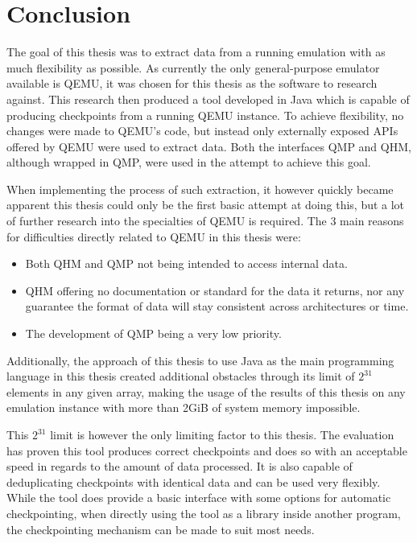 
\chapter{Conclusion}\label{chap:Conclusion}
The goal of this thesis was to extract data from a running emulation
with as much flexibility as possible.
As currently the only general-purpose emulator available is QEMU,
it was chosen for this thesis as the software to research against.
This research then produced a tool developed in Java
which is capable of producing checkpoints from a running QEMU instance.
To achieve flexibility, no changes were made to QEMU's code,
but instead only externally exposed APIs offered by QEMU were used to extract data.
Both the interfaces QMP and QHM, although wrapped in QMP,
were used in the attempt to achieve this goal.

When implementing the process of such extraction,
it however quickly became apparent this thesis could only be the first basic attempt at doing this,
but a lot of further research into the specialties of QEMU is required.
The 3 main reasons for difficulties directly related to QEMU in this thesis were:
\begin{itemize}
    \item Both QHM and QMP not being intended to access internal data.
    \item QHM offering no documentation or standard for the data it returns,
    nor any guarantee the format of data will stay consistent across architectures or time.
    \item The development of QMP being a very low priority.
\end{itemize}
Additionally, the approach of this thesis to use Java as the main programming language in this thesis created additional obstacles
through its limit of $2^{31}$ elements in any given array,
making the usage of the results of this thesis on any emulation instance with more than 2GiB of system memory impossible.

This $2^{31}$ limit is however the only limiting factor to this thesis.
The evaluation has proven this tool produces correct checkpoints and does so with an acceptable speed in regards to the amount of data processed.
It is also capable of deduplicating checkpoints with identical data and can be used very flexibly.
While the tool does provide a basic interface with some options for automatic checkpointing,
when directly using the tool as a library inside another program,
the checkpointing mechanism can be made to suit most needs.

